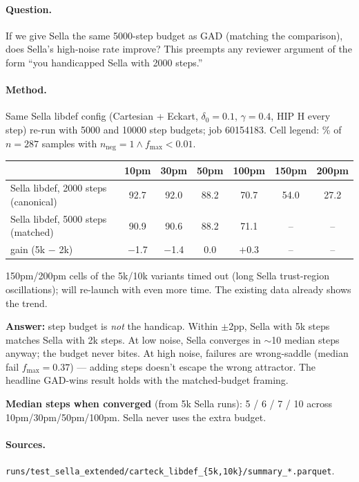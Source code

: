 \documentclass[11pt]{article}
\begin{document}
\paragraph{Question.} If we give Sella the same 5000-step budget as GAD
(matching the comparison), does Sella's high-noise rate improve? This
preempts any reviewer argument of the form ``you handicapped Sella with
2000 steps.''

\paragraph{Method.} Same Sella libdef config (Cartesian + Eckart, $\delta_0{=}0.1$,
$\gamma{=}0.4$, HIP H every step) re-run with 5000 and 10000 step budgets;
job 60154183. Cell legend: \% of $n=287$ samples with $n_{\text{neg}}=1 \wedge f_{\max}<0.01$.

\begin{center}\small
\begin{tabular}{l|cccccc}
\toprule
                       & 10pm & 30pm & 50pm & 100pm & 150pm & 200pm \\
\midrule
Sella libdef, 2000 steps (canonical)  & 92.7 & 92.0 & 88.2 & 70.7 & 54.0 & 27.2 \\
Sella libdef, 5000 steps (matched)    & 90.9 & 90.6 & 88.2 & 71.1 & --   & --   \\
gain (5k $-$ 2k)                       & $-$1.7 & $-$1.4 & 0.0  & $+$0.3 & --   & --   \\
\bottomrule
\end{tabular}
\end{center}
{\small 150pm/200pm cells of the 5k/10k variants timed out (long Sella
trust-region oscillations); will re-launch with even more time. The
existing data already shows the trend.}

\textbf{Answer:} step budget is \emph{not} the handicap. Within $\pm$2pp,
Sella with 5k steps matches Sella with 2k steps. At low noise, Sella
converges in $\sim$10 median steps anyway; the budget never bites. At
high noise, failures are wrong-saddle (median fail $f_{\max}=0.37$) —
adding steps doesn't escape the wrong attractor. The headline GAD-wins
result holds with the matched-budget framing.

\textbf{Median steps when converged} (from 5k Sella runs): 5 / 6 / 7 / 10
across 10pm/30pm/50pm/100pm. Sella never uses the extra budget.

\paragraph{Sources.} \texttt{runs/test\_sella\_extended/carteck\_libdef\_\{5k,10k\}/summary\_*.parquet}.
\end{document}
